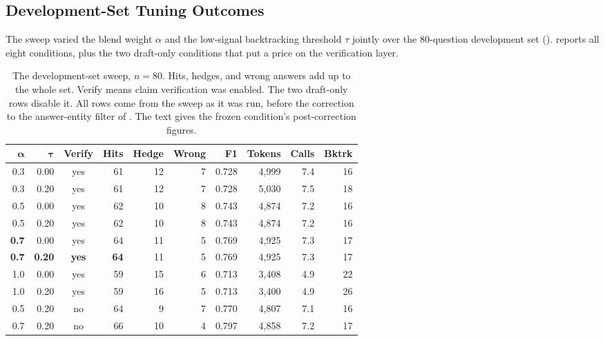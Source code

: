 \subsection{Development-Set Tuning Outcomes}\label{sec:dev-tuning}

The sweep varied the blend weight $\alpha$ and the low-signal backtracking
threshold $\tau$ jointly over the $80$-question development set
().  reports all eight conditions, plus
the two draft-only conditions that put a price on the verification layer.

\begin{table}[!tb]
  \begin{center}
    \caption[The development-set sweep]{The development-set sweep, $n = 80$.
    Hits, hedges, and wrong answers add up to the whole set. \textsf{Verify}
    means claim verification was enabled. The two draft-only rows disable it.
    All rows come from the sweep as it was run, before the correction to the
    answer-entity filter of . The text gives the
    frozen condition's post-correction figures.}
    \label{tab:sweep}
    \small
    \begin{tabular}{|r|r|c|r|r|r|r|r|r|r|}
      \hline
      $\boldsymbol{\alpha}$ & $\boldsymbol{\tau}$ & \textbf{Verify} &
      \textbf{Hits} & \textbf{Hedge} & \textbf{Wrong} & \textbf{F1} &
      \textbf{Tokens} & \textbf{Calls} & \textbf{Bktrk} \\
      \hline
      0.3 & 0.00 & yes & 61 & 12 & 7 & 0.728 & 4{,}999 & 7.4 & 16 \\
      0.3 & 0.20 & yes & 61 & 12 & 7 & 0.728 & 5{,}030 & 7.5 & 18 \\
      0.5 & 0.00 & yes & 62 & 10 & 8 & 0.743 & 4{,}874 & 7.2 & 16 \\
      0.5 & 0.20 & yes & 62 & 10 & 8 & 0.743 & 4{,}874 & 7.2 & 16 \\
      \textbf{0.7} & 0.00 & yes & 64 & 11 & 5 & 0.769 & 4{,}925 & 7.3 & 17 \\
      \textbf{0.7} & \textbf{0.20} & \textbf{yes} & \textbf{64} & 11 & 5 & 0.769
        & 4{,}925 & 7.3 & 17 \\
      1.0 & 0.00 & yes & 59 & 15 & 6 & 0.713 & 3{,}408 & 4.9 & 22 \\
      1.0 & 0.20 & yes & 59 & 16 & 5 & 0.713 & 3{,}400 & 4.9 & 26 \\
      \hline
      0.5 & 0.20 & no  & 64 &  9 & 7 & 0.770 & 4{,}807 & 7.1 & 16 \\
      0.7 & 0.20 & no  & 66 & 10 & 4 & 0.797 & 4{,}858 & 7.2 & 17 \\
      \hline
    \end{tabular}
  \end{center}
\end{table}

